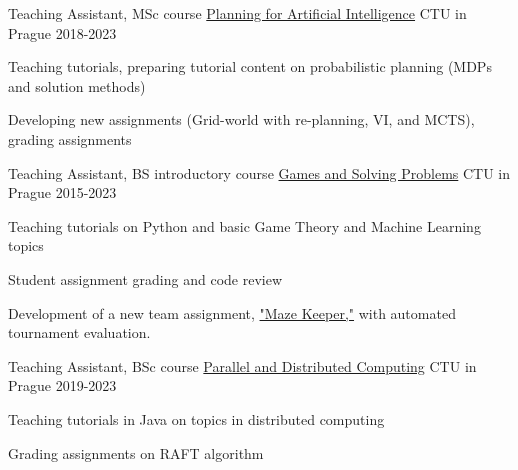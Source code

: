 


\begin{cventries}


  \cventry
    {Teaching Assistant, MSc course} %
    {\href{https://cw.fel.cvut.cz/b222/courses/pui/tutorials}{Planning for Artificial Intelligence}} %
    {CTU in Prague} %
    {2018-2023} %
    {
      \begin{cvitems} %
        \item {Teaching tutorials, preparing tutorial content on probabilistic planning (MDPs and solution methods)}
        \item {Developing new assignments (Grid-world with re-planning, VI, and MCTS), grading assignments}
      \end{cvitems}
    }

  \cventry
    {Teaching Assistant, BS introductory course} %
    {\href{https://cw.fel.cvut.cz/b221/courses/b4b33rph/start}{Games and Solving Problems}} %
    {CTU in Prague} %
    {2015-2023} %
    {
      \begin{cvitems} %
        \item {Teaching tutorials on Python and basic Game Theory and Machine Learning topics}
        \item {Student assignment grading and code review}
        \item {Development of a new team assignment, \href{https://cw.fel.cvut.cz/b181/courses/b4b33rph/cviceni/maze_keeper}{"Maze Keeper,"} with automated tournament evaluation.}
      \end{cvitems}
    }

  \cventry
    {Teaching Assistant, BSc course} %
    {\href{https://cw.fel.cvut.cz/b222/courses/b4b36pdv/tutorials/start}{Parallel and Distributed Computing}} %
    {CTU in Prague} %
    {2019-2023} %
    {
      \begin{cvitems} %
        \item {Teaching tutorials in Java on topics in distributed computing}
        \item {Grading assignments on RAFT algorithm}
      \end{cvitems}
    }
    
\end{cventries}


